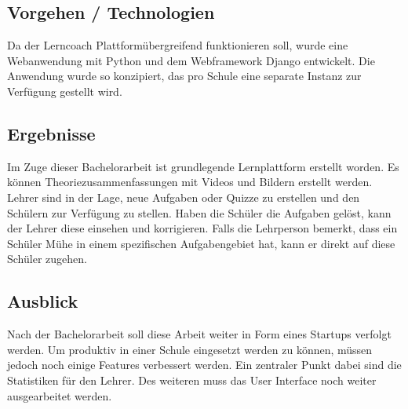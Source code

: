 
\subsection*{Vorgehen / Technologien}
Da der Lerncoach Plattformübergreifend funktionieren soll, wurde eine Webanwendung mit Python und dem Webframework Django entwickelt. Die Anwendung wurde so konzipiert, das pro Schule eine separate Instanz zur Verfügung gestellt wird.

\subsection*{Ergebnisse}
Im Zuge dieser Bachelorarbeit ist grundlegende Lernplattform erstellt worden. Es können Theoriezusammenfassungen mit Videos und Bildern erstellt werden. Lehrer sind in der Lage, neue Aufgaben oder Quizze zu erstellen und den Schülern zur Verfügung zu stellen. Haben die Schüler die Aufgaben gelöst, kann der Lehrer diese einsehen und korrigieren. Falls die Lehrperson bemerkt, dass ein Schüler Mühe in einem spezifischen Aufgabengebiet hat, kann er direkt auf diese Schüler zugehen.

\subsection*{Ausblick}
Nach der Bachelorarbeit soll diese Arbeit weiter in Form eines Startups verfolgt werden. Um produktiv in einer Schule eingesetzt werden zu können, müssen jedoch noch einige Features verbessert werden. Ein zentraler Punkt dabei sind die Statistiken für den Lehrer. Des weiteren muss das User Interface noch weiter ausgearbeitet werden.


\newpage
